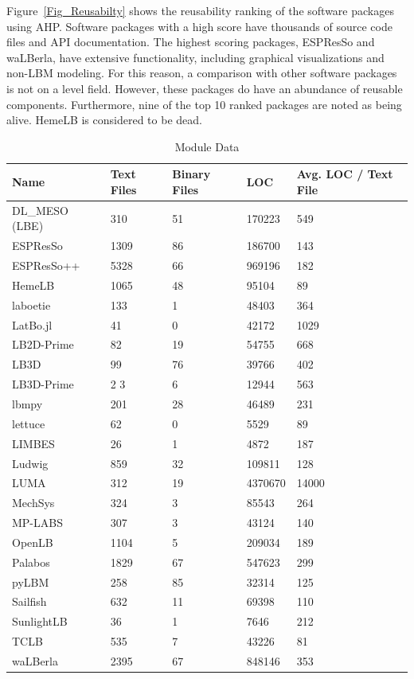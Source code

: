 \documentclass[final, 3p, times, authoryear]{elsarticle}
\begin{document}
Figure~\ref{Fig_Reusabilty} shows the reusability ranking of the software
packages using AHP. Software packages with a high score have thousands of source
code files and API documentation. The highest scoring packages, ESPResSo and
waLBerla, have extensive functionality, including graphical visualizations and
non-LBM modeling. For this reason, a comparison with other software packages is
not on a level field. However, these packages do have an abundance of reusable
components. Furthermore, nine of the top 10 ranked packages are noted as being
alive. HemeLB is considered to be dead.

\begin{table}
	\begin{center}
		\begin{tabular}{ p{3.5cm}p{2cm}p{2.5cm}p{2cm}p{2.5cm} }
			\hline
			Name & Text Files & Binary Files & LOC & Avg. LOC / Text File\\
			\hline
			DL\_MESO (LBE) & 310 & 51 & 170223 & 549\\
			ESPResSo & 1309& 86 & 186700 & 143\\
			ESPResSo++ & 5328& 66 & 969196 & 182\\
			HemeLB & 1065& 48 & 95104 & 89\\
			laboetie & 133& 1 & 48403 & 364\\		
			LatBo.jl & 41& 0 & 42172 & 1029\\
			LB2D-Prime & 82& 19 & 54755 & 668\\
			LB3D & 99 & 76 & 39766 & 402\\
			LB3D-Prime & 2 3& 6 & 12944 & 563\\
			lbmpy& 201 & 28 & 46489 & 231\\
			lettuce & 62 & 0 & 5529 & 89\\
			LIMBES & 26 & 1 & 4872 & 187\\
			Ludwig & 859 & 32 & 109811 & 128\\
			LUMA & 312 & 19 & 4370670 & 14000\\
			MechSys & 324 & 3 & 85543 & 264\\
			MP-LABS & 307 & 3 & 43124 & 140\\
			OpenLB & 1104 & 5 & 209034 & 189\\
			Palabos & 1829 & 67 & 547623 & 299\\
			pyLBM & 258 & 85 & 32314 & 125\\
			Sailfish & 632 & 11 & 69398 & 110\\
			SunlightLB & 36 & 1 & 7646 & 212\\
			TCLB & 535 & 7 & 43226 & 81\\
			waLBerla & 2395 & 67 & 848146 & 353\\
			\hline
		\end{tabular}
		\caption{Module Data} \label{moduledata}
	\end{center}
\end{table}
\end{document}
